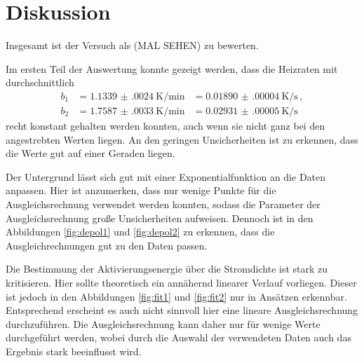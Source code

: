 \section{Diskussion}
\label{sec:Diskussion}

Insgesamt ist der Versuch als (MAL SEHEN) zu bewerten.

Im ersten Teil der Auswertung konnte gezeigt werden, dass die Heizraten mit
durchschnittlich
\begin{align*}
  b_1&=\SI{1.1339(0024)}{\kelvin\per\minute}&= \SI{0.01890(00004)}{\kelvin\per\second}\,, \\
  b_2&=\SI{1.7587(0033)}{\kelvin\per\minute}&= \SI{0.02931(00005)}{\kelvin\per\second}\,
\end{align*}
recht konstant gehalten werden konnten, auch wenn sie nicht ganz bei den angestrebten
Werten liegen. An den geringen Unsicherheiten ist zu erkennen, dass die Werte gut auf einer
Geraden liegen.

Der Untergrund lässt sich gut mit einer Exponentialfunktion an die Daten anpassen.
Hier ist anzumerken, dass nur wenige Punkte für die Ausgleichsrechnung verwendet
werden konnten, sodass die Parameter der Ausgleichsrechnung große Unsicherheiten
aufweisen. Dennoch ist in den Abbildungen \ref{fig:depol1} und \ref{fig:depol2}
zu erkennen, dass die Ausgleichrechnungen gut zu den Daten passen.

Die Bestimmung der Aktivierungsenergie über die Stromdichte ist stark zu kritisieren.
Hier sollte theoretisch ein annähernd linearer Verlauf vorliegen. Dieser ist jedoch
in den Abbildungen \ref{fig:fit1} und \ref{fig:fit2} nur in Ansätzen erkennbar.
Entsprechend erscheint es auch nicht sinnvoll hier eine lineare Ausgleichsrechnung
durchzuführen. Die Ausgleichsrechnung kann daher nur für wenige Werte durchgeführt
werden, wobei durch die Auswahl der verwendeten Daten auch das Ergebnis stark beeinflusst
wird.
